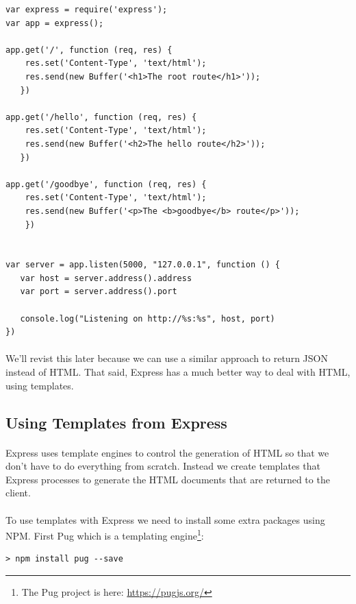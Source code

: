 \documentclass[10pt, a4paper, twosize]{article}
\begin{document}
\begin{lstlisting}
var express = require('express');
var app = express();

app.get('/', function (req, res) {
    res.set('Content-Type', 'text/html');
    res.send(new Buffer('<h1>The root route</h1>'));
   })

app.get('/hello', function (req, res) {
    res.set('Content-Type', 'text/html');
    res.send(new Buffer('<h2>The hello route</h2>'));
   })

app.get('/goodbye', function (req, res) {
    res.set('Content-Type', 'text/html');
    res.send(new Buffer('<p>The <b>goodbye</b> route</p>'));
    })


var server = app.listen(5000, "127.0.0.1", function () {
   var host = server.address().address
   var port = server.address().port
   
   console.log("Listening on http://%s:%s", host, port)
})
\end{lstlisting}

\paragraph{} We'll revist this later because we can use a similar approach to return JSON instead of HTML. That said, Express has a much better way to deal with HTML, using templates.

\subsection{Using Templates from Express}
\paragraph{} Express uses template engines to control the generation of HTML so that we don't have to do everything from scratch. Instead we create templates that Express processes to generate the HTML documents that are returned to the client. 

\paragraph{} To use templates with Express we need to install some extra packages using NPM. First Pug which is a templating engine\footnote{The Pug project is here: \url{https://pugjs.org/}}:

\begin{lstlisting}[style=DOS]
    > npm install pug --save
\end{lstlisting}
\end{document}
